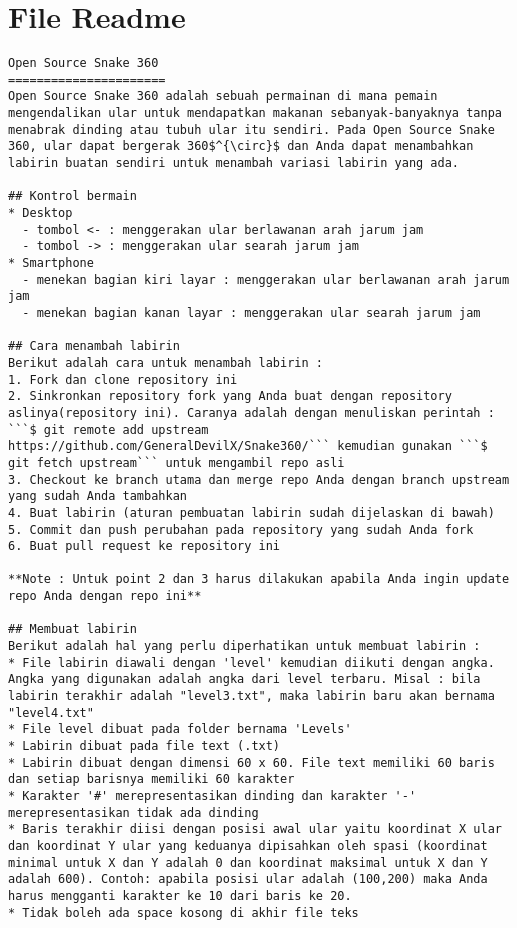\chapter{File Readme}
\label{lamp:B}

\begin{lstlisting}[language={}, caption=README.md]
Open Source Snake 360
======================
Open Source Snake 360 adalah sebuah permainan di mana pemain mengendalikan ular untuk mendapatkan makanan sebanyak-banyaknya tanpa menabrak dinding atau tubuh ular itu sendiri. Pada Open Source Snake 360, ular dapat bergerak 360$^{\circ}$ dan Anda dapat menambahkan labirin buatan sendiri untuk menambah variasi labirin yang ada.

## Kontrol bermain
* Desktop
  - tombol <- : menggerakan ular berlawanan arah jarum jam
  - tombol -> : menggerakan ular searah jarum jam
* Smartphone 
  - menekan bagian kiri layar : menggerakan ular berlawanan arah jarum jam
  - menekan bagian kanan layar : menggerakan ular searah jarum jam
  
## Cara menambah labirin
Berikut adalah cara untuk menambah labirin :
1. Fork dan clone repository ini
2. Sinkronkan repository fork yang Anda buat dengan repository aslinya(repository ini). Caranya adalah dengan menuliskan perintah : ```$ git remote add upstream https://github.com/GeneralDevilX/Snake360/``` kemudian gunakan ```$ git fetch upstream``` untuk mengambil repo asli
3. Checkout ke branch utama dan merge repo Anda dengan branch upstream yang sudah Anda tambahkan
4. Buat labirin (aturan pembuatan labirin sudah dijelaskan di bawah)
5. Commit dan push perubahan pada repository yang sudah Anda fork
6. Buat pull request ke repository ini

**Note : Untuk point 2 dan 3 harus dilakukan apabila Anda ingin update repo Anda dengan repo ini**

## Membuat labirin
Berikut adalah hal yang perlu diperhatikan untuk membuat labirin : 
* File labirin diawali dengan 'level' kemudian diikuti dengan angka. Angka yang digunakan adalah angka dari level terbaru. Misal : bila labirin terakhir adalah "level3.txt", maka labirin baru akan bernama "level4.txt"
* File level dibuat pada folder bernama 'Levels'
* Labirin dibuat pada file text (.txt)
* Labirin dibuat dengan dimensi 60 x 60. File text memiliki 60 baris dan setiap barisnya memiliki 60 karakter
* Karakter '#' merepresentasikan dinding dan karakter '-' merepresentasikan tidak ada dinding
* Baris terakhir diisi dengan posisi awal ular yaitu koordinat X ular dan koordinat Y ular yang keduanya dipisahkan oleh spasi (koordinat minimal untuk X dan Y adalah 0 dan koordinat maksimal untuk X dan Y adalah 600). Contoh: apabila posisi ular adalah (100,200) maka Anda harus mengganti karakter ke 10 dari baris ke 20.
* Tidak boleh ada space kosong di akhir file teks
\end{lstlisting}